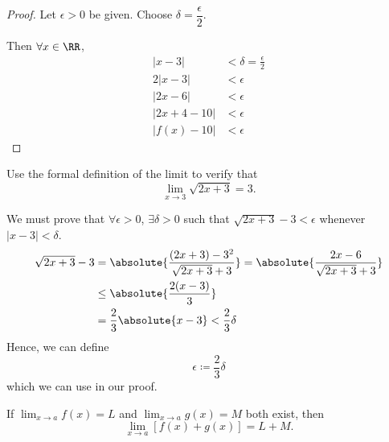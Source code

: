 \begin{proof}
Let $\epsilon > 0$ be given. Choose $\delta = \dfrac{\epsilon}{2}$.

Then $\forall x \in \RR$, 
\begin{align*}
|x-3| &< \delta = \frac{\epsilon}{2} \\
2|x-3| &< \epsilon \\
|2x-6| &< \epsilon \\
|2x+4-10| &< \epsilon \\
|f(x)-10| &< \epsilon
\end{align*}
\end{proof}

\begin{exercise}
Use the formal definition of the limit to verify that 
\[ \lim_{x \to 3} \sqrt{2x+3} = 3. \]
\end{exercise}

We must prove that $\forall \epsilon > 0$, $\exists \delta > 0$ such that $\sqrt{2x+3} - 3 < \epsilon$ whenever $|x-3|<\delta$.
\begin{align*}
\sqrt{2x+3} - 3 &= \absolute{\frac{(2x+3)-3^2}{\sqrt{2x+3} + 3}} = \absolute{\frac{2x-6}{\sqrt{2x+3} + 3}} \\
&\le \absolute{\frac{2(x-3)}{3}} \\
&= \frac{2}{3} \absolute{x-3} < \frac{2}{3} \delta
\end{align*}
Hence, we can define 
\[ \epsilon \coloneqq \frac{2}{3} \delta \]
which we can use in our proof.

\begin{proposition}
If $\lim_{x\to a}f(x)=L$ and $\lim_{x\to a}g(x)=M$ both exist, then
\[ \lim_{x\to a}[f(x)+g(x)]=L+M. \]
\end{proposition}

